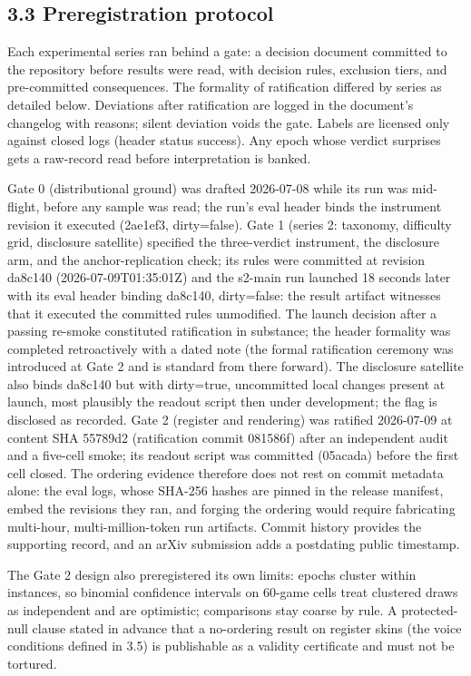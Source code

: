 \documentclass[11pt]{article}
\begin{document}
\subsection*{3.3 Preregistration protocol}

Each experimental series ran behind a gate: a decision document
committed to the repository before results were read, with decision
rules, exclusion tiers, and pre-committed consequences. The formality of
ratification differed by series as detailed below. Deviations after
ratification are logged in the document's changelog with reasons; silent
deviation voids the gate. Labels are licensed only against closed logs
(header status success). Any epoch whose verdict surprises gets a
raw-record read before interpretation is banked.

Gate 0 (distributional ground) was drafted 2026-07-08 while its run was
mid-flight, before any sample was read; the run's eval header binds the
instrument revision it executed (2ae1ef3, dirty=false). Gate 1 (series
2: taxonomy, difficulty grid, disclosure satellite) specified the
three-verdict instrument, the disclosure arm, and the anchor-replication
check; its rules were committed at revision da8c140
(2026-07-09T01:35:01Z) and the s2-main run launched 18 seconds later
with its eval header binding da8c140, dirty=false: the result artifact
witnesses that it executed the committed rules unmodified. The launch
decision after a passing re-smoke constituted ratification in substance;
the header formality was completed retroactively with a dated note (the
formal ratification ceremony was introduced at Gate 2 and is standard
from there forward). The disclosure satellite also binds da8c140 but
with dirty=true, uncommitted local changes present at launch, most
plausibly the readout script then under development; the flag is
disclosed as recorded. Gate 2 (register and rendering) was ratified
2026-07-09 at content SHA 55789d2 (ratification commit 081586f) after an
independent audit and a five-cell smoke; its readout script was
committed (05acada) before the first cell closed. The ordering evidence
therefore does not rest on commit metadata alone: the eval logs, whose
SHA-256 hashes are pinned in the release manifest, embed the revisions
they ran, and forging the ordering would require fabricating multi-hour,
multi-million-token run artifacts. Commit history provides the
supporting record, and an arXiv submission adds a postdating public
timestamp.

The Gate 2 design also preregistered its own limits: epochs cluster
within instances, so binomial confidence intervals on 60-game cells
treat clustered draws as independent and are optimistic; comparisons
stay coarse by rule. A protected-null clause stated in advance that a
no-ordering result on register skins (the voice conditions defined in
3.5) is publishable as a validity certificate and must not be tortured.
\end{document}
